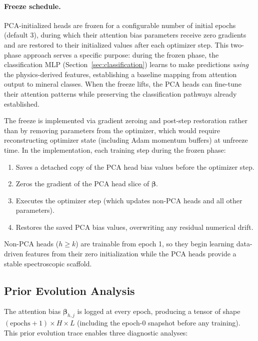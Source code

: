 \documentclass[11pt]{report}
\begin{document}
\paragraph{Freeze schedule.}
PCA-initialized heads are frozen for a configurable number of initial epochs (default 3), during which their attention bias parameters receive zero gradients and are restored to their initialized values after each optimizer step. This two-phase approach serves a specific purpose: during the frozen phase, the classification MLP (Section~\ref{sec:classification}) learns to make predictions \emph{using} the physics-derived features, establishing a baseline mapping from attention output to mineral classes. When the freeze lifts, the PCA heads can fine-tune their attention patterns while preserving the classification pathways already established.

The freeze is implemented via gradient zeroing and post-step restoration rather than by removing parameters from the optimizer, which would require reconstructing optimizer state (including Adam momentum buffers) at unfreeze time. In the implementation, each training step during the frozen phase:
\begin{enumerate}[nosep]
  \item Saves a detached copy of the PCA head bias values before the optimizer step.
  \item Zeros the gradient of the PCA head slice of $\bm{\beta}$.
  \item Executes the optimizer step (which updates non-PCA heads and all other parameters).
  \item Restores the saved PCA bias values, overwriting any residual numerical drift.
\end{enumerate}
Non-PCA heads ($h \geq k$) are trainable from epoch 1, so they begin learning data-driven features from their zero initialization while the PCA heads provide a stable spectroscopic scaffold.

\subsection{Prior Evolution Analysis}
\label{sec:prior_evolution}

The attention bias $\bm{\beta}_{h,j}$ is logged at every epoch, producing a tensor of shape $(\text{epochs}+1) \times H \times L$ (including the epoch-0 snapshot before any training). This prior evolution trace enables three diagnostic analyses:
\end{document}
